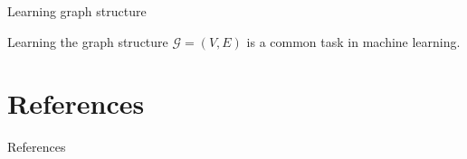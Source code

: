 \documentclass{beamer}					%
\begin{document}
\begin{frame}{Learning graph structure}

Learning the graph structure $\mathcal{G}=(V,E)$ is a common task in machine learning.\\

\end{frame}

\section{References}

\begin{frame}[allowframebreaks]{References}
	\tiny
	
\end{frame}
\end{document}
